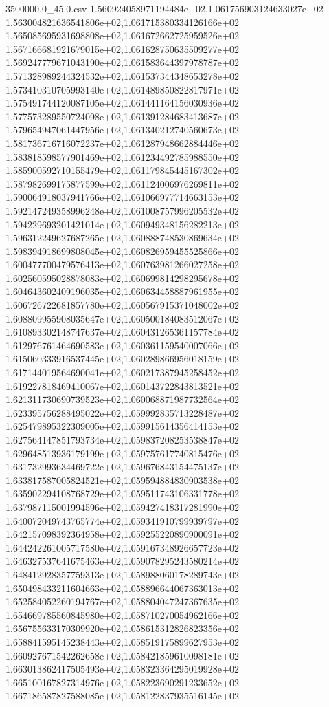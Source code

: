 \begin{filecontents*}{3500000.0_45.0.csv}
1.560924058971194484e+02,1.061756903124633027e+02
1.563004821636541806e+02,1.061715380334126166e+02
1.565085695931698808e+02,1.061672662725959526e+02
1.567166681921679015e+02,1.061628750635509277e+02
1.569247779671043190e+02,1.061583644397978787e+02
1.571328989244324532e+02,1.061537344348653278e+02
1.573410310705993140e+02,1.061489850822817971e+02
1.575491744120087105e+02,1.061441164156030936e+02
1.577573289550724098e+02,1.061391284683413687e+02
1.579654947061447956e+02,1.061340212740560673e+02
1.581736716716072237e+02,1.061287948662884446e+02
1.583818598577901469e+02,1.061234492785988550e+02
1.585900592710155479e+02,1.061179845445167302e+02
1.587982699175877599e+02,1.061124006976269811e+02
1.590064918037941766e+02,1.061066977714663153e+02
1.592147249358996248e+02,1.061008757996205532e+02
1.594229693201421014e+02,1.060949348156282213e+02
1.596312249627687265e+02,1.060888748530869634e+02
1.598394918699808045e+02,1.060826959455525866e+02
1.600477700479576413e+02,1.060763981266027258e+02
1.602560595028878083e+02,1.060699814298295678e+02
1.604643602409196035e+02,1.060634458887961955e+02
1.606726722681857780e+02,1.060567915371048002e+02
1.608809955908035647e+02,1.060500184083512067e+02
1.610893302148747637e+02,1.060431265361157784e+02
1.612976761464690583e+02,1.060361159540007066e+02
1.615060333916537445e+02,1.060289866956018159e+02
1.617144019564690041e+02,1.060217387945258452e+02
1.619227818469410067e+02,1.060143722843813521e+02
1.621311730690739523e+02,1.060068871987732564e+02
1.623395756288495022e+02,1.059992835713228487e+02
1.625479895322309005e+02,1.059915614356414153e+02
1.627564147851793734e+02,1.059837208253538847e+02
1.629648513936179199e+02,1.059757617740815476e+02
1.631732993634469722e+02,1.059676843154475137e+02
1.633817587005824521e+02,1.059594884830903538e+02
1.635902294108768729e+02,1.059511743106331778e+02
1.637987115001994596e+02,1.059427418317281990e+02
1.640072049743765774e+02,1.059341910799939797e+02
1.642157098392364958e+02,1.059255220890900091e+02
1.644242261005717580e+02,1.059167348926657723e+02
1.646327537641675463e+02,1.059078295243580214e+02
1.648412928357759313e+02,1.058988060178289743e+02
1.650498433211604663e+02,1.058896644067363013e+02
1.652584052260194767e+02,1.058804047247367635e+02
1.654669785560845980e+02,1.058710270054962166e+02
1.656755633170309920e+02,1.058615312826823356e+02
1.658841595145238443e+02,1.058519175899627953e+02
1.660927671542262658e+02,1.058421859610098181e+02
1.663013862417505493e+02,1.058323364295019928e+02
1.665100167827314976e+02,1.058223690291233652e+02
1.667186587827588085e+02,1.058122837935516145e+02

\end{filecontents*}
